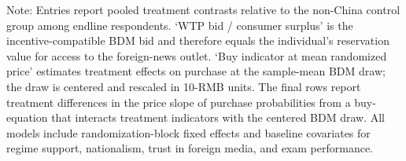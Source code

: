 \begin{table}[H]
\begin{threeparttable}
\begin{tablenotes}[flushleft]
\item Note: Entries report pooled treatment contrasts relative to the non-China control group among endline respondents. `WTP bid / consumer surplus' is the incentive-compatible BDM bid and therefore equals the individual's reservation value for access to the foreign-news outlet. `Buy indicator at mean randomized price' estimates treatment effects on purchase at the sample-mean BDM draw; the draw is centered and rescaled in 10-RMB units. The final rows report treatment differences in the price slope of purchase probabilities from a buy-equation that interacts treatment indicators with the centered BDM draw. All models include randomization-block fixed effects and baseline covariates for regime support, nationalism, trust in foreign media, and exam performance.
\end{tablenotes}
\end{threeparttable}
\end{table}
